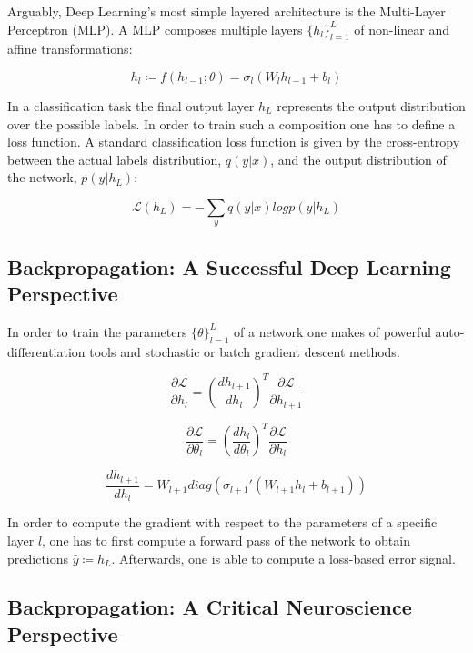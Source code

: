 \documentclass[colorinlistoftodos]{article}
\theoremstyle{definition}
\begin{document}
Arguably, Deep Learning's most simple layered architecture is the Multi-Layer Perceptron (MLP). A MLP composes multiple layers $\{h_l\}_{l=1}^L$ of non-linear and affine transformations:

$$h_l \coloneqq f(h_{l-1}; \theta) = \sigma_l (W_l h_{l-1} + b_l)$$ 

In a classification task the final output layer $h_L$ represents the output distribution over the possible labels. In order to train such a composition one has to define a loss function. A standard classification loss function is given by the cross-entropy between the actual labels distribution, $q(y|x)$, and the output distribution of the network, $p(y|h_L)$:

$$\mathcal{L}(h_L) = - \sum_y q(y|x) log p(y|h_L)$$

\subsection*{Backpropagation: A Successful Deep Learning Perspective}

In order to train the parameters $\{\theta\}_{l=1}^L$ of a network one makes of powerful auto-differentiation tools and stochastic or batch gradient descent methods.

\begin{equation}
	\frac{\partial \mathcal{L}}{\partial h_l} = \left(\frac{dh_{l+1}}{d h_{l}}\right)^T \frac{\partial \mathcal{L}}{\partial h_{l+1}}
\end{equation}

\begin{equation}
	\frac{\partial \mathcal{L}}{\partial \theta_l} = \left(\frac{dh_{l}}{d \theta_{l}}\right)^T \frac{\partial \mathcal{L}}{\partial h_{l}}
\end{equation}

\begin{equation}
	\frac{dh_{l+1}}{dh_l} = W_{l+1} diag\left(\sigma_{l+1}'(W_{l+1}h_l +b_{l+1})\right)
\end{equation}

In order to compute the gradient with respect to the parameters of a specific layer $l$, one has to first compute a forward pass of the network to obtain predictions $\hat{y} \coloneqq h_L$. Afterwards, one is able to compute a loss-based error signal. 

\subsection*{Backpropagation: A Critical Neuroscience Perspective}
\end{document}
